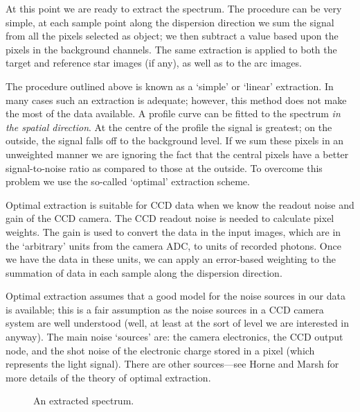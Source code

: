 \documentclass[twoside,11pt]{article}
\newcommand{\htmlref}[2]{#1}
\newcommand{\scspec}[2]{#1}
\newcommand{\scspec}[2]{#2}
\begin{document}
At this point we are ready to extract the spectrum.
The procedure can be very simple, at each sample point along the
dispersion direction we sum the signal from all the pixels selected
as object; we then subtract a value based upon the pixels in the
background channels.
The same extraction is applied to both the target and reference star
images (if any), as well as to the arc images.

The procedure outlined above is known as a `simple' or `linear' extraction.
In many cases such an extraction is adequate; however,
this method does not make the most of the data available.
A profile curve can be fitted to the spectrum {\em in the spatial direction}.
At the centre of the profile the signal is greatest;
on the outside, the signal falls off to the background level.
If we sum these pixels in an unweighted manner we are ignoring the
fact that the central pixels have a better signal-to-noise ratio as
compared to those at the outside.
To overcome this problem we use the so-called `optimal' extraction scheme.

Optimal extraction is suitable for \htmlref{CCD}{gl_ccd} data
when we know the \htmlref{readout noise}{gl_readout_noise} and
\htmlref{gain}{gl_gain} of the CCD camera.
The CCD readout noise is needed to calculate pixel weights.
The gain is used to convert the data in the input images, which are
in the `arbitrary' units from the camera \htmlref{ADC}{gl_adc}, to
units of recorded photons.
Once we have the data in these units, we can apply an error-based weighting
to the summation of data in each sample along the dispersion direction.

Optimal extraction assumes that a good model for the noise
sources in our data is available; this is a fair assumption as the noise
sources in a CCD camera system are well understood (well, at least at the
sort of level we are interested in anyway).
The main noise `sources' are: the camera electronics, the CCD output node,
and the shot noise of the electronic charge stored in a pixel (which
represents the light signal).
There are other sources\scspec{---}{ - }see Horne\cite{horne} and
Marsh\cite{marsh} for more details of the theory of optimal extraction.

\begin{figure}
\begin{center}
  \scspec{\leavevmode\epsfysize=105mm\epsfbox{sc7_07.eps}}
         {\leavevmode\epsfysize=136mm}

  \parbox{140mm}{
    \caption{An extracted spectrum.}
    \label{fi_extracted_spectrum}
  }
\end{center}
\end{figure}
\end{document}
